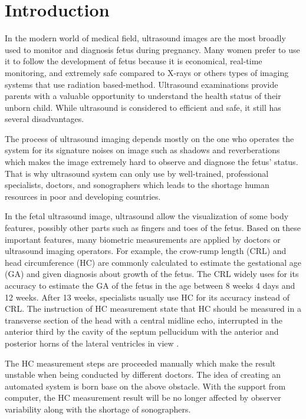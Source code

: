 \chapter{Introduction}
\noindent


	
	In the modern world of medical field, ultrasound images are the most broadly used to monitor and diagnosis fetus during pregnancy. Many women prefer to use it to follow the development of fetus because it is economical, real-time monitoring, and extremely safe compared to X-rays or others types of imaging systems that use radiation based-method. Ultrasound examinations provide parents with a valuable opportunity to understand the health status of their unborn child. While ultrasound is considered to efficient and safe, it still has several disadvantages. 
	
	The process of ultrasound imaging depends mostly on the one who operates the system for its signature noises on image such as shadows and reverberations which makes the image extremely hard to observe and diagnose the fetus’ status. That is why ultrasound system can only use by well-trained, professional specialists, doctors, and sonographers which leads to the shortage human resources in poor and developing countries.
	
	In the fetal ultrasound image, ultrasound allow the visualization of some body features, possibly other parts such as fingers and toes of the fetus. Based on these important features, many biometric measurements are applied by doctors or ultrasound imaging operators. For example, the crow-rump length (CRL) and head circumference (HC) are commonly calculated to estimate the gestational age (GA) and given diagnosis about growth of the fetus. The CRL widely uses for its accuracy to estimate the GA of the fetus in the age between 8 weeks 4 days and 12 weeks.	 After 13 weeks, specialists usually use HC for its accuracy instead of CRL. The instruction of HC measurement state that HC should be measured in a transverse section of the head with a central midline echo, interrupted in the anterior third by the cavity of the septum pellucidum with the anterior and posterior horns of the lateral ventricles in view \cite{thomas}. 
	
	The HC measurement steps are proceeded manually which make the result unstable when being conducted by different doctors. The idea of creating an automated system is born base on the above obstacle. With the support from computer, the HC measurement result will be no longer affected by observer variability along with the shortage of sonographers.

